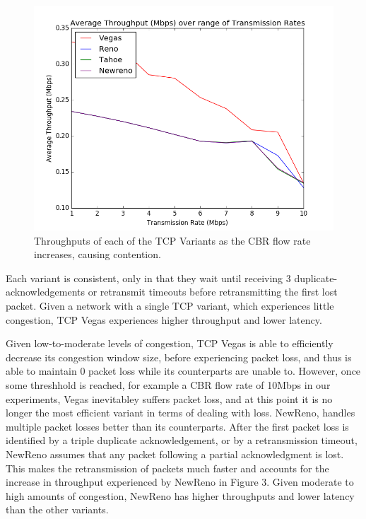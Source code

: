 \begin{figure}[!htbp]

	\includegraphics[scale=0.4]{P2.png}
	\caption{Throughputs of each of the TCP Variants as the CBR flow rate increases, causing contention.}
	\label{a:label}
\end{figure}

Each variant is consistent, only in that they wait until receiving 3 duplicate-acknowledgements or retransmit timeouts before retransmitting the first lost packet. Given a network with a single TCP variant, which experiences little congestion, TCP Vegas experiences higher throughput and lower latency. 

Given low-to-moderate levels of congestion, TCP Vegas is able to efficiently decrease its congestion window size, before experiencing packet loss, and thus is able to maintain 0 packet loss while its counterparts are unable to. However, once some threshhold is reached, for example a CBR flow rate of 10Mbps in our experiments, Vegas inevitabley suffers packet loss, and at this point it is no longer the most efficient variant in terms of dealing with loss. NewReno, handles multiple packet losses better than its counterparts. After the first packet loss is identified by a triple duplicate acknowledgement, or by a retransmission timeout, NewReno assumes that any packet following a partial acknowledgment is lost. This makes the retransmission of packets much faster and accounts for the increase in throughput experienced by NewReno in Figure 3. Given moderate to high amounts of congestion, NewReno has higher throughputs and lower latency than the other variants.


